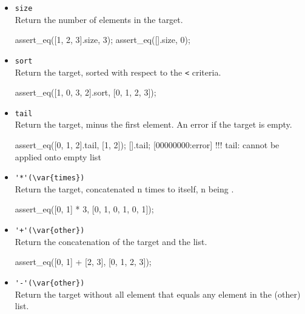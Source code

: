 \begin{itemize}
\begin{urbiscript}[firstnumber=last]
var f = [0, 1, 2];
[00000000] [0, 1, 2]
f[1] = 42;
[00000000] 42
assert_eq(f, [0, 42, 2]);
\end{urbiscript}

\item \lstinline|size|\\
Return the number of elements in the target.

\begin{urbiscript}[firstnumber=last]
assert_eq([1, 2, 3].size, 3);
assert_eq([].size, 0);
\end{urbiscript}

\item \lstinline|sort|\\
Return the target, sorted with respect to the \lstinline|<| criteria.

\begin{urbiscript}[firstnumber=last]
assert_eq([1, 0, 3, 2].sort, [0, 1, 2, 3]);
\end{urbiscript}

\item \lstinline|tail|\\
Return the target, minus the first element. An error if the target is
empty.

\begin{urbiscript}[firstnumber=last]
assert_eq([0, 1, 2].tail, [1, 2]);
[].tail;
[00000000:error] !!! tail: cannot be applied onto empty list
\end{urbiscript}

\item \lstinline|'*'(\var{times})|\\
Return the target, concatenated n times to itself, n being .

\begin{urbiscript}[firstnumber=last]
assert_eq([0, 1] * 3, [0, 1, 0, 1, 0, 1]);
\end{urbiscript}

\item \lstinline|'+'(\var{other})|\\
Return the concatenation of the target and the  list.

\begin{urbiscript}[firstnumber=last]
assert_eq([0, 1] + [2, 3], [0, 1, 2, 3]);
\end{urbiscript}

\item \lstinline|'-'(\var{other})|\\
Return the target without all element that equals any element in the
\var(other) list.


\end{itemize}
